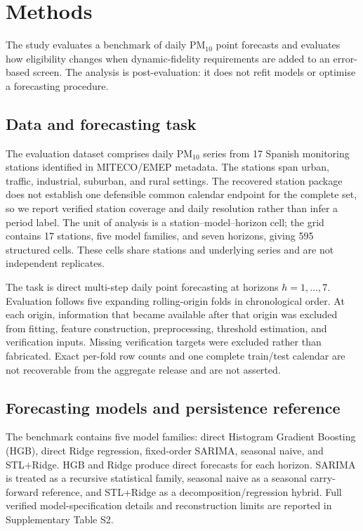 \section{Methods}
\label{sec:methods}

The study evaluates a benchmark of daily PM$_{10}$ point forecasts
and evaluates how eligibility changes when dynamic-fidelity requirements are
added to an error-based screen. The analysis is post-evaluation: it does
not refit models or optimise a forecasting procedure.

\subsection{Data and forecasting task}

The evaluation dataset comprises daily PM$_{10}$ series from 17 Spanish
monitoring stations identified in MITECO/EMEP metadata. The stations span
urban, traffic, industrial, suburban, and rural settings. The recovered
station package does not establish one defensible common calendar endpoint
for the complete set, so we report verified station coverage and daily
resolution rather than infer a period label. The unit of analysis is a
station--model--horizon cell; the grid contains 17 stations, five model
families, and seven horizons, giving 595 structured cells. These cells
share stations and underlying series and are not independent replicates.

The task is direct multi-step daily point forecasting at horizons
$h=1,\ldots,7$. Evaluation follows five expanding rolling-origin folds in
chronological order. At each origin, information that became available
after that origin was excluded from fitting, feature construction,
preprocessing, threshold estimation, and verification inputs. Missing
verification targets were excluded rather than fabricated. Exact per-fold
row counts and one complete train/test calendar are not recoverable from
the aggregate release and are not asserted.

\subsection{Forecasting models and persistence reference}

The benchmark contains five model families: direct Histogram Gradient
Boosting (HGB), direct Ridge regression, fixed-order SARIMA, seasonal
naive, and STL+Ridge. HGB and Ridge produce direct forecasts for each
horizon. SARIMA is treated as a recursive statistical family, seasonal
naive as a seasonal carry-forward reference, and STL+Ridge as a
decomposition/regression hybrid. Full verified model-specification details
and reconstruction limits are reported in Supplementary Table S2.

